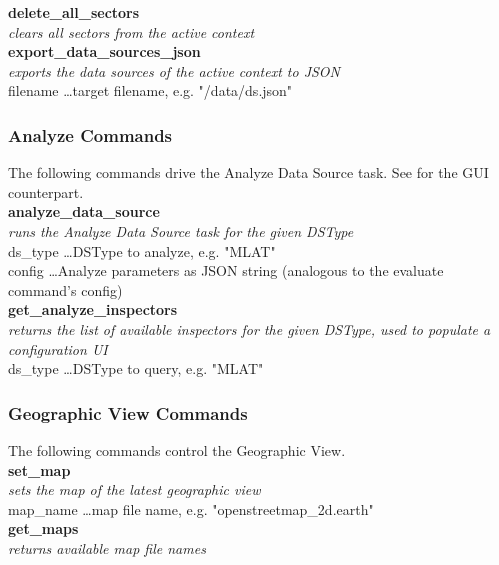 \textbf{delete\_all\_sectors} \\
\textit{clears all sectors from the active context} \\

\textbf{export\_data\_sources\_json} \\
\textit{exports the data sources of the active context to JSON} \\
filename \dots target filename, e.g. "/data/ds.json" \\

\subsubsection{Analyze Commands}

The following commands drive the Analyze Data Source task. See  for the GUI counterpart. \\

\textbf{analyze\_data\_source} \\
\textit{runs the Analyze Data Source task for the given DSType} \\
ds\_type \dots DSType to analyze, e.g. "MLAT" \\
config \dots Analyze parameters as JSON string (analogous to the evaluate command's config) \\

\textbf{get\_analyze\_inspectors} \\
\textit{returns the list of available inspectors for the given DSType, used to populate a configuration UI} \\
ds\_type \dots DSType to query, e.g. "MLAT" \\

\subsubsection{Geographic View Commands}

The following commands control the Geographic View. \\

\textbf{set\_map} \\
\textit{sets the map of the latest geographic view} \\
map\_name \dots map file name, e.g. "openstreetmap\_2d.earth" \\

\textbf{get\_maps} \\
\textit{returns available map file names} \\

